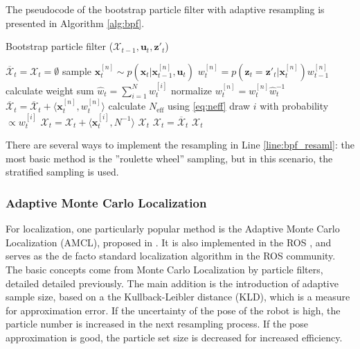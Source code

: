 The pseudocode of the bootstrap particle filter with adaptive resampling is presented in Algorithm \ref{alg:bpf}.
\begin{algorithm}[b!]
  \caption{Bootstrap particle filter ($\mathcal{X}_{t-1}, \mathbf{u}_t, \mathbf{z}'_t$)}\label{alg:bpf}
  \begin{algorithmic}[1]
    \State $\overline{\mathcal{X}}_t = \mathcal{X}_t = \emptyset$
    \State sample $\mathbf{x}_t^{[n]} \sim p(\mathbf{x}_t|\mathbf{x}_{t-1}^{[n]},\mathbf{u}_t)$
    \State$w_t^{[n]} = p(\mathbf{z}_t = \mathbf{z}'_t|\mathbf{x}_{t}^{[n]})w_{t-1}^{[n]}$
    \EndFor
    \State calculate weight sum $\hat{w}_{t} = \sum_{i = 1}^{N}w_t^{[i]}$
    \State normalize $w_t^{[n]} = w_t^{[n]}\hat{w}_t^{-1}$
    \State$\overline{\mathcal{X}}_t = \overline{\mathcal{X}}_t + \langle \mathbf{x}_t^{[n]},w_t^{[n]}\rangle$
    \EndFor
    \State calculate $N_{\mathrm{eff}}$ using \eqref{eq:neff}
    \State draw $i$ with probability $\propto w_t^{[i]}$ \label{line:bpf_resaml}
    \State${\mathcal{X}}_t ={\mathcal{X}}_t + \langle \mathbf{x}_t^{[i]},N^{-1}\rangle$
    \EndFor
    \State\Return $\mathcal{X}_t$
    \Else
    \State$\mathcal{X}_t = \overline{\mathcal{X}}_t$
    \State\Return $\mathcal{X}_t$
    \EndIf
  \end{algorithmic}
\end{algorithm}
There are several ways to implement the resampling in Line \ref{line:bpf_resaml}: the most basic method is the ''roulette wheel'' sampling, but in this scenario, the stratified sampling \cite{Li2015} is used.

\subsubsection{Adaptive Monte Carlo Localization}

For localization, one particularly popular method is the Adaptive Monte Carlo Localization (AMCL),
proposed in \cite{Fox2002}. It is also implemented in the ROS \cite{AMCLROS2002}, and serves as the de facto standard localization algorithm in the ROS community.
The basic concepts come from Monte Carlo Localization by particle filters,
detailed detailed  previously.
The main addition is the introduction of adaptive sample size, based on a
the Kullback-Leibler distance (KLD), which is a measure for approximation error.
If the uncertainty of the pose of the robot is high, the particle number
is increased in the next resampling process. If the pose approximation
is good, the particle set size is decreased for increased efficiency.


